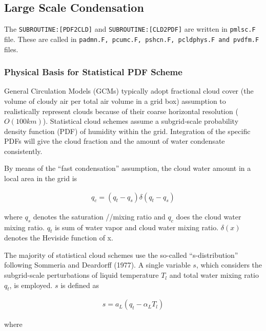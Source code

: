 \hypertarget{large-scale-condensation}{%
\subsection{Large Scale Condensation}\label{large-scale-condensation}}

The \texttt{SUBROUTINE:{[}PDF2CLD{]}} and \texttt{SUBROUTINE:{[}CLD2PDF{]}} are written in \texttt{pmlsc.F} file. These are called in \texttt{padmn.F,\ pcumc.F,\ pshcn.F,\ pcldphys.F\ and\ pvdfm.F}
files.

\hypertarget{physical-basis-for-statistical-pdf-scheme}{%
\subsubsection{Physical Basis for Statistical PDF Scheme}\label{physical-basis-for-statistical-pdf-scheme}}

General Circulation Models (GCMs) typically adopt fractional cloud cover (the volume of cloudy air per total air volume in a grid box) assumption to realistically represent clouds because of their
coarse horizontal resolution (\(O(100km)\)). Statistical cloud schemes assume a subgrid‐scale probability density function (PDF) of humidity within the grid. Integration of the specific PDFs will give
the cloud fraction and the amount of water condensate consistently.

By means of the ``fast condensation'' assumption, the cloud water amount in a local area in the grid is

\begin{eqnarray}
q_{c}=\left(q_{t}-q_{s}\right) \delta\left(q_{t}-q_{s}\right)
\label{hpc.1}
\end{eqnarray}

where \(q_s\) denotes the saturation //mixing ratio and \(q_c\) does the cloud water mixing ratio. \(q_t\) is sum of water vapor and cloud water mixing ratio. \(\delta(x)\) denotes the Heviside
function of x.

The majority of statistical cloud schemes use the so-called ``s-distribution'' following Sommeria and Deardorff (1977). A single variable \(s\), which considers the subgrid-scale perturbations of
liquid temperature \(T_l\) and total water mixing ratio \(q_t\), is employed. \(s\) is defined as

\begin{eqnarray}
s=a_{L}\left(q_{t}-\alpha_{L} T_{l}\right)
\end{eqnarray}

where

